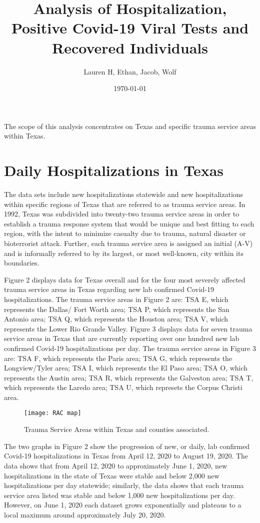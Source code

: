 \documentclass{article}
\title{Analysis of Hospitalization, Positive Covid-19 Viral Tests and Recovered Individuals}
\author{Lauren H, Ethan, Jacob, Wolf\\}
\date{\today}
\begin{document}
\maketitle
The scope of this analysis concentrates on Texas and specific trauma service areas within Texas.


\section{Daily Hospitalizations in Texas}

The data sets include new hospitalizations statewide and new hospitalizations within specific regions of Texas that are referred to as trauma service areas. In 1992, Texas was subdivided into twenty-two trauma service areas in order to establish a trauma response system that would be unique and best fitting to each region, with the intent to minimize casualty due to trauma, natural disaster or bioterrorist attack. Further, each trauma service area is assigned an initial (A-V) and is informally referred to by its largest, or most well-known, city within its boundaries. 

\vspace{2mm}

Figure 2 displays data for Texas overall and for the four most severely affected trauma service areas in Texas regarding new lab confirmed Covid-19 hospitalizations. The trauma service areas in Figure 2 are: TSA E, which represents the Dallas/ Fort Worth area; TSA P, which represents the San Antonio area; TSA Q, which represents the Houston area; TSA V, which represents the Lower Rio Grande Valley.  Figure 3 displays data for seven trauma service areas in Texas that are currently reporting over one hundred new lab confirmed Covid-19 hospitalizations per day. The trauma service areas in Figure 3 are: TSA F, which represents the Paris area; TSA G, which represents the Longview/Tyler area; TSA I, which represents the El Paso area; TSA O, which represents the Austin area; TSA R, which represents the Galveston area; TSA T, which represents the  Laredo area; TSA U, which represets the Corpus Christi area. 

\vspace{1cm}
\begin{figure}[!htbp]
	\centering
	\texttt{[image: RAC map]}
	\caption{\footnotesize{Trauma Service Areas within Texas and counties associated.} }
	\label{fig:1}
\end{figure}		
	\FloatBarrier

The two graphs in Figure 2 show the progression of new, or daily, lab confirmed Covid-19 hospitalizations in Texas from April 12, 2020 to August 19, 2020. The data shows that from April 12, 2020 to approximately June 1, 2020, new hospitalizations in the state of Texas were stable and below 2,000 new hospitalizations per day statewide; similarly, the data shows that each trauma service area listed was stable and below 1,000 new hospitalizations per day. However, on June 1, 2020 each dataset grows exponentially and plateaus to a local maximum around approximately July 20, 2020. 
\end{document}

